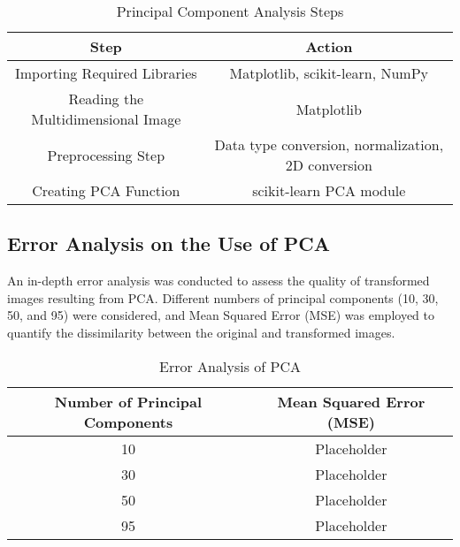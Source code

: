 \documentclass[conference]{IEEEtran}
\begin{document}
\begin{table}[H]
    \caption{Principal Component Analysis Steps}
    \begin{center}
        \begin{tabular}{|c|c|}
            \hline
            \textbf{Step} & \textbf{Action} \\
            \hline
            Importing Required Libraries & Matplotlib, scikit-learn, NumPy \\
            \hline
            Reading the Multidimensional Image & Matplotlib \\
            \hline
            Preprocessing Step & Data type conversion, normalization, 2D conversion \\
            \hline
            Creating PCA Function & scikit-learn PCA module \\
            \hline
        \end{tabular}
    \end{center}
\end{table}

\subsection{Error Analysis on the Use of PCA}
An in-depth error analysis was conducted to assess the quality of transformed images resulting from PCA. Different numbers of principal components (10, 30, 50, and 95) were considered, and Mean Squared Error (MSE) was employed to quantify the dissimilarity between the original and transformed images.

\begin{table}[H]
    \caption{Error Analysis of PCA}
    \begin{center}
        \begin{tabular}{|c|c|}
            \hline
            \textbf{Number of Principal Components} & \textbf{Mean Squared Error (MSE)} \\
            \hline
            10 & Placeholder \\
            \hline
            30 & Placeholder \\
            \hline
            50 & Placeholder \\
            \hline
            95 & Placeholder \\
            \hline
        \end{tabular}
    \end{center}
\end{table}
\end{document}

